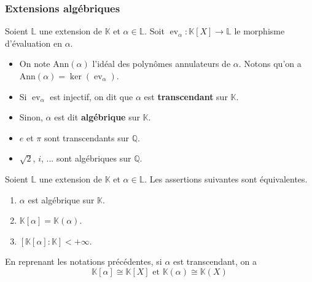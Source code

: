	\subsubsection{Extensions algébriques}


	\begin{definition}
		Soient $\mathbb{L}$ une extension de $\mathbb{K}$ et $\alpha \in \mathbb{L}$. Soit $\operatorname{ev}_\alpha : \mathbb{K}[X] \rightarrow \mathbb{L}$ le morphisme d'évaluation en $\alpha$.
		\begin{itemize}
			\item On note $\mathrm{Ann}(\alpha)$ l'idéal des polynômes annulateurs de $\alpha$. Notons qu'on a $\mathrm{Ann}(\alpha) = \ker(\operatorname{ev}_\alpha)$.
			\item Si $\operatorname{ev}_\alpha$ est injectif, on dit que $\alpha$ est \textbf{transcendant} sur $\mathbb{K}$.
			\item Sinon, $\alpha$ est dit \textbf{algébrique} sur $\mathbb{K}$.
		\end{itemize}
	\end{definition}

	\begin{example}
		\begin{itemize}
			\item $e$ et $\pi$ sont transcendants sur $\mathbb{Q}$.
			\item $\sqrt{2}$, $i$, ... sont algébriques sur $\mathbb{Q}$.
		\end{itemize}
	\end{example}

	\begin{proposition}
		Soient $\mathbb{L}$ une extension de $\mathbb{K}$ et $\alpha \in \mathbb{L}$. Les assertions suivantes sont équivalentes.
		\begin{enumerate}[label=(\roman*)]
			\item $\alpha$ est algébrique sur $\mathbb{K}$.
			\item $\mathbb{K}[\alpha] = \mathbb{K}(\alpha)$.
			\item $[\mathbb{K}[\alpha]:\mathbb{K}] < +\infty$.
		\end{enumerate}
	\end{proposition}

	\begin{proposition}
		En reprenant les notations précédentes, si $\alpha$ est transcendant, on a
		\[ \mathbb{K}[\alpha] \cong \mathbb{K}[X] \text{ et } \mathbb{K}(\alpha) \cong \mathbb{K}(X) \]
	\end{proposition}

